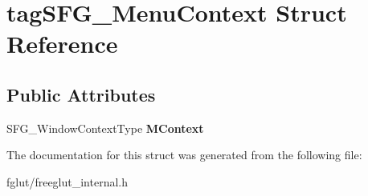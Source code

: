 \hypertarget{structtag_s_f_g___menu_context}{}\section{tag\+S\+F\+G\+\_\+\+Menu\+Context Struct Reference}
\label{structtag_s_f_g___menu_context}
\subsection*{Public Attributes}
\begin{DoxyCompactItemize}
\item 
S\+F\+G\+\_\+\+Window\+Context\+Type {\bfseries M\+Context}\hypertarget{structtag_s_f_g___menu_context_a463a2d14e50c4e984182afc7a9c75e65}{}\label{structtag_s_f_g___menu_context_a463a2d14e50c4e984182afc7a9c75e65}

\end{DoxyCompactItemize}


The documentation for this struct was generated from the following file\+:\begin{DoxyCompactItemize}
\item 
fglut/freeglut\+\_\+internal.\+h\end{DoxyCompactItemize}
